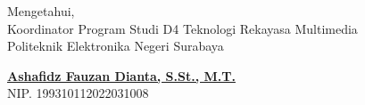 \begin{center}
    \vspace{0.8cm}
    
    {\fontsize{9pt}{11pt}\selectfont Mengetahui,\\
    Koordinator Program Studi D4 Teknologi Rekayasa Multimedia\\
    Politeknik Elektronika Negeri Surabaya}
    
    \vspace{1.5cm}
    
    \underline{\textbf{\fontsize{10pt}{12pt}\selectfont Ashafidz Fauzan Dianta, S.St., M.T.}}\\
    {\fontsize{9pt}{11pt}\selectfont NIP. 199310112022031008}
\end{center}
\newpage
